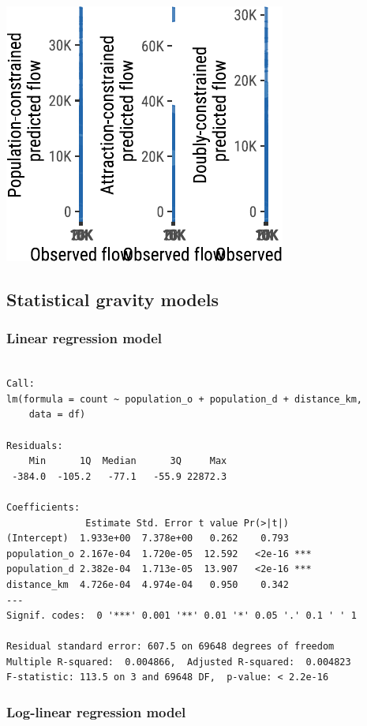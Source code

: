 \documentclass[
  a4paper, 
  twoside,
  final
]{article}
\newcounter{code}
\begin{document}
\includegraphics{region-quarto-template_files/figure-pdf/unnamed-chunk-9-1.pdf}

\subsection{Statistical gravity
models}\label{statistical-gravity-models}

\subsubsection{Linear regression model}\label{linear-regression-model}

\begin{verbatim}

Call:
lm(formula = count ~ population_o + population_d + distance_km, 
    data = df)

Residuals:
    Min      1Q  Median      3Q     Max 
 -384.0  -105.2   -77.1   -55.9 22872.3 

Coefficients:
              Estimate Std. Error t value Pr(>|t|)    
(Intercept)  1.933e+00  7.378e+00   0.262    0.793    
population_o 2.167e-04  1.720e-05  12.592   <2e-16 ***
population_d 2.382e-04  1.713e-05  13.907   <2e-16 ***
distance_km  4.726e-04  4.974e-04   0.950    0.342    
---
Signif. codes:  0 '***' 0.001 '**' 0.01 '*' 0.05 '.' 0.1 ' ' 1

Residual standard error: 607.5 on 69648 degrees of freedom
Multiple R-squared:  0.004866,  Adjusted R-squared:  0.004823 
F-statistic: 113.5 on 3 and 69648 DF,  p-value: < 2.2e-16
\end{verbatim}

\subsubsection{Log-linear regression
model}\label{log-linear-regression-model}
\end{document}
